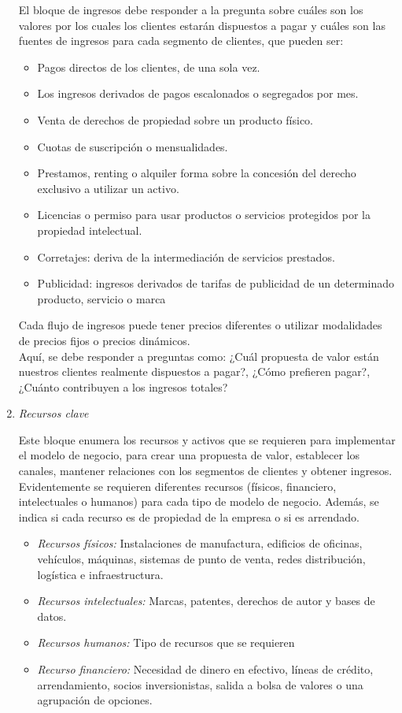 \documentclass[10pt,a4paper]{article}
\begin{document}
\begin{multicols}{2}
\begin{enumerate}[1.]
			El bloque de ingresos debe responder a la pregunta sobre cuáles son los valores por los cuales los clientes estarán dispuestos a pagar y cuáles son las fuentes de ingresos para cada segmento de clientes, que pueden ser: 
			
				\begin{itemize}
					\item Pagos directos de los clientes, de una sola vez.
					\item Los ingresos derivados de pagos escalonados o segregados por mes.
					\item Venta de derechos de propiedad sobre un producto físico.
					\item Cuotas de suscripción o mensualidades.
					\item Prestamos, renting o alquiler forma sobre la concesión del derecho exclusivo a utilizar un activo.
					\item Licencias o permiso para usar productos o servicios protegidos por la propiedad intelectual.
					\item Corretajes: deriva de la intermediación de servicios prestados.
					\item Publicidad: ingresos derivados de tarifas de publicidad de un determinado producto, servicio o marca
				\end{itemize}
			Cada flujo de ingresos puede tener precios diferentes o utilizar modalidades de precios fijos o precios dinámicos.\\
			
			Aquí, se debe responder a preguntas como: ¿Cuál propuesta de valor están nuestros clientes realmente dispuestos a pagar?, ¿Cómo prefieren pagar?, ¿Cuánto contribuyen a los ingresos totales?
			
			\item \textit{Recursos clave}
			
			Este bloque enumera los recursos y activos que se requieren para implementar el modelo de negocio, para crear una propuesta de valor, establecer los canales, mantener relaciones con los segmentos de clientes y obtener ingresos.\\
			
			Evidentemente se requieren diferentes recursos (físicos, financiero, intelectuales o humanos) para cada tipo de modelo de negocio. Además, se indica si cada recurso es de propiedad de la empresa o si es arrendado.	
				\begin{itemize}
					\item \textit{Recursos físicos:} Instalaciones de manufactura, edificios de oficinas, vehículos, máquinas, sistemas de punto de venta, redes distribución, logística e infraestructura.
					\item \textit{Recursos intelectuales:} Marcas, patentes, derechos de autor y bases de datos.
					\item \textit{Recursos humanos:} Tipo de recursos que se requieren
					\item \textit{ Recurso financiero:} Necesidad de dinero en efectivo, líneas de crédito, arrendamiento, socios inversionistas, salida a bolsa de valores o una agrupación de opciones.
				\end{itemize}
			

\end{enumerate}
\end{multicols}
\end{document}
